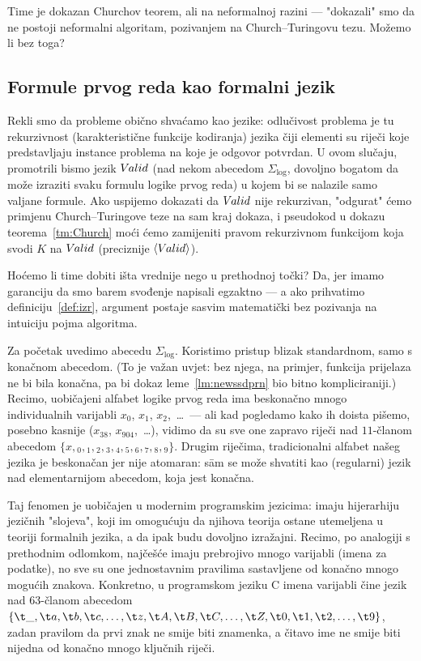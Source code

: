 
Time je dokazan Churchov teorem, ali na neformalnoj razini --- "dokazali" smo da ne postoji neformalni algoritam, pozivanjem na Church--\!Turingovu tezu. Možemo li bez toga?

\subsection{Formule prvog reda kao formalni jezik}

Rekli smo da probleme obično shvaćamo kao jezike: odlučivost problema je tu rekurzivnost (karakteristične funkcije kodiranja) jezika čiji elementi su riječi koje predstavljaju instance problema na koje je odgovor potvrdan. U ovom slučaju, promotrili bismo jezik $V\mspace{-1.5mu}alid$ (nad nekom abecedom $\Sigma_{\log}$, dovoljno bogatom da može izraziti svaku formulu logike prvog reda) u kojem bi se nalazile samo valjane formule. Ako uspijemo dokazati da $V\mspace{-1.5mu}alid$ nije rekurzivan, "odgurat" ćemo primjenu Church--\!Turingove teze na sam kraj dokaza, i pseudokod u dokazu teorema~\ref{tm:Church} moći ćemo zamijeniti pravom rekurzivnom funkcijom koja svodi $K$ na $V\mspace{-1.5mu}alid$ (preciznije $\langle V\mspace{-1.5mu}alid\rangle$).

Hoćemo li time dobiti išta vrednije nego u prethodnoj točki? Da, jer imamo garanciju da smo barem svođenje napisali egzaktno --- a ako prihvatimo definiciju~\ref{def:izr}, argument postaje sasvim matematički bez pozivanja na intuiciju pojma algoritma.

Za početak uvedimo abecedu $\Sigma_{\log}$. Koristimo pristup blizak standardnom, samo s konačnom abecedom. (To je važan uvjet: bez njega, na primjer, funkcija prijelaza ne bi bila konačna, pa bi dokaz leme~\ref{lm:newssdprn} bio bitno kompliciraniji.) Recimo, uobičajeni alfabet logike prvog reda ima beskonačno mnogo individualnih varijabli $x_0$, $x_1$, $x_2$,~\ldots\ --- ali kad pogledamo kako ih doista pišemo, posebno kasnije ($x_{38}$, $x_{904}$,~\ldots), vidimo da su sve one zapravo riječi nad $11$-članom abecedom $\{x,{}_0,{}_1,{}_2,{}_3,{}_4,{}_5,{}_6,{}_7,{}_8,{}_9\}$. Drugim riječima, tradicionalni alfabet našeg jezika je beskonačan jer nije atomaran: s\=am se može shvatiti kao (regularni) jezik nad elementarnijom abecedom, koja jest konačna.

Taj fenomen je uobičajen u modernim programskim jezicima: imaju hijerarhiju jezičnih "slojeva", koji im omogućuju da njihova teorija ostane utemeljena u teoriji formalnih jezika, a da ipak budu dovoljno izražajni. Recimo, po analogiji s prethodnim odlomkom, najčešće imaju prebrojivo mnogo varijabli (imena za podatke), no sve su one jednostavnim pravilima sastavljene od konačno mnogo mogućih znakova. Konkretno, u programskom jeziku C imena varijabli čine jezik nad $63$-članom abecedom $\{\t\_,\t a,\t b,\t c,\dotsc,\t z,\t A,\t B,\t C,\dotsc,\t Z,\t 0,\t 1,\t 2,\dotsc,\t 9\}$, zadan pravilom da prvi znak ne smije biti znamenka, a čitavo ime ne smije biti nijedna od konačno mnogo ključnih riječi.

